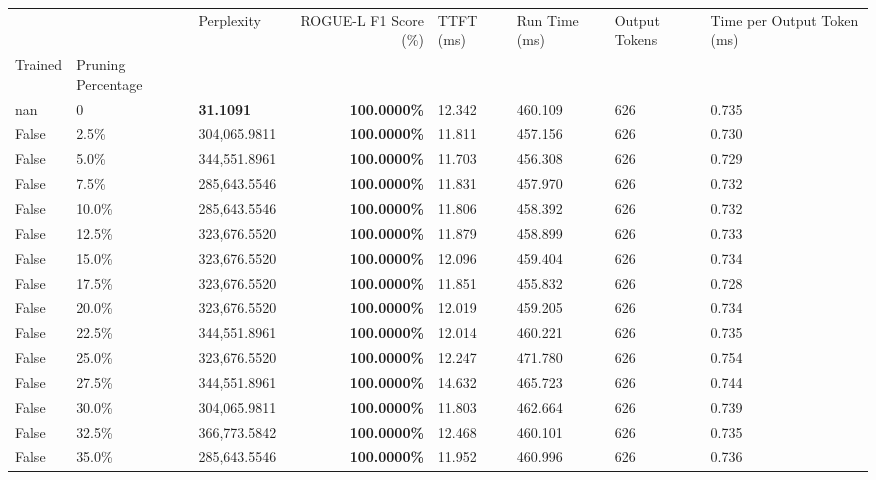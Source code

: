 \begin{table}[H]
\label{tab:evaluation-pipeline-5-untrained}
\begin{tabular}{lllrllll}
\toprule
 &  & Perplexity & ROGUE-L F1 Score (\%) & TTFT (ms) & Run Time (ms) & Output Tokens & Time per Output Token (ms) \\
Trained & Pruning Percentage &  &  &  &  &  &  \\
\midrule
nan & 0 & \bfseries 31.1091 & \bfseries 100.0000\% & 12.342 & 460.109 & 626 & 0.735 \\
\cline{1-8}
False & 2.5\% & 304,065.9811 & \bfseries \color{red} 100.0000\% & 11.811 & 457.156 & 626 & 0.730 \\
\cline{1-8}
False & 5.0\% & 344,551.8961 & \bfseries \color{red} 100.0000\% & 11.703 & 456.308 & 626 & 0.729 \\
\cline{1-8}
False & 7.5\% & \color{red} 285,643.5546 & \bfseries \color{red} 100.0000\% & 11.831 & 457.970 & 626 & 0.732 \\
\cline{1-8}
False & 10.0\% & \color{red} 285,643.5546 & \bfseries \color{red} 100.0000\% & 11.806 & 458.392 & 626 & 0.732 \\
\cline{1-8}
False & 12.5\% & 323,676.5520 & \bfseries \color{red} 100.0000\% & 11.879 & 458.899 & 626 & 0.733 \\
\cline{1-8}
False & 15.0\% & 323,676.5520 & \bfseries \color{red} 100.0000\% & 12.096 & 459.404 & 626 & 0.734 \\
\cline{1-8}
False & 17.5\% & 323,676.5520 & \bfseries \color{red} 100.0000\% & 11.851 & 455.832 & 626 & 0.728 \\
\cline{1-8}
False & 20.0\% & 323,676.5520 & \bfseries \color{red} 100.0000\% & 12.019 & 459.205 & 626 & 0.734 \\
\cline{1-8}
False & 22.5\% & 344,551.8961 & \bfseries \color{red} 100.0000\% & 12.014 & 460.221 & 626 & 0.735 \\
\cline{1-8}
False & 25.0\% & 323,676.5520 & \bfseries \color{red} 100.0000\% & 12.247 & 471.780 & 626 & 0.754 \\
\cline{1-8}
False & 27.5\% & 344,551.8961 & \bfseries \color{red} 100.0000\% & 14.632 & 465.723 & 626 & 0.744 \\
\cline{1-8}
False & 30.0\% & 304,065.9811 & \bfseries \color{red} 100.0000\% & 11.803 & 462.664 & 626 & 0.739 \\
\cline{1-8}
False & 32.5\% & 366,773.5842 & \bfseries \color{red} 100.0000\% & 12.468 & 460.101 & 626 & 0.735 \\
\cline{1-8}
False & 35.0\% & \color{red} 285,643.5546 & \bfseries \color{red} 100.0000\% & 11.952 & 460.996 & 626 & 0.736 \\

\end{tabular}
\end{table}
